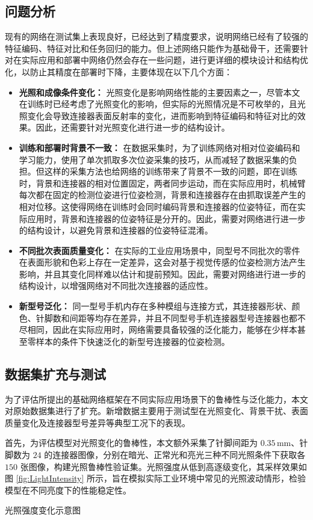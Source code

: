 \documentclass{Diploma}
\begin{document}
\subsection{问题分析}
现有的网络在测试集上表现良好，已经达到了精度要求，说明网络已经有了较强的特征编码、特征对比和任务回归的能力。但上述网络只能作为基础骨干，还需要针对在实际应用和部署中网络仍然会存在一些问题，进行更详细的模块设计和结构优化，以防止其精度在部署时下降，主要体现在以下几个方面：
\begin{itemize}
  \item \textbf{光照和成像条件变化：} 光照变化是影响网络性能的主要因素之一，尽管本文在训练时已经考虑了光照变化的影响，但实际的光照情况是不可枚举的，且光照变化会导致连接器表面反射率的变化，进而影响到特征编码和特征对比的效果。因此，还需要针对光照变化进行进一步的结构设计。
  \item \textbf{训练和部署时背景不一致：} 在数据采集时，为了训练网络对相对位姿编码和学习能力，使用了单次抓取多次位姿采集的技巧，从而减轻了数据采集的负担。但这样的采集方法也给网络的训练带来了背景不一致的问题，即在训练时，背景和连接器的相对位置固定，两者同步运动，而在实际应用时，机械臂每次都在固定的检测位姿进行位姿检测，背景和连接器存在由抓取误差产生的相对位移。这使得网络在训练时会同时编码背景和连接器的位姿特征，而在实际应用时，背景和连接器的位姿特征是分开的。因此，需要对网络进行进一步的结构设计，以避免背景和连接器的位姿特征混淆。
  \item \textbf{不同批次表面质量变化：} 在实际的工业应用场景中，同型号不同批次的零件在表面形貌和色彩上存在一定差异，这会对基于视觉传感的位姿检测方法产生影响，并且其变化同样难以估计和提前预知。因此，需要对网络进行进一步的结构设计，以增强网络对不同批次连接器的适应性。
  \item \textbf{新型号泛化：} 同一型号手机内存在多种模组与连接方式，其连接器形状、颜色、针脚数和间距等均存在差异，并且不同型号手机连接器型号连接器也都不尽相同，因此在实际应用时，网络需要具备较强的泛化能力，能够在少样本甚至零样本的条件下快速泛化的新型号连接器的位姿检测。 
\end{itemize}
\subsection{数据集扩充与测试}
为了评估所提出的基础网络框架在不同实际应用场景下的鲁棒性与泛化能力，本文对原始数据集进行了扩充。新增数据主要用于测试型在光照变化、背景干扰、表面质量变化及连接器型号差异等典型工况下的表现。

首先，为评估模型对光照变化的鲁棒性，本文额外采集了针脚间距为 $0.35\,\mathrm{mm}$、针脚数为 $24$ 的连接器图像，分别在暗光、正常光和亮光三种不同光照条件下获取各 $150$ 张图像，构建光照鲁棒性验证集。光照强度从低到高逐级变化，其采样效果如图 \ref{fig:LightIntensity} 所示，旨在模拟实际工业环境中常见的光照波动情形，检验模型在不同亮度下的性能稳定性。
\begin{subfigures}[LightIntensity]{光照强度变化示意图}
\end{subfigures}
\end{document}
